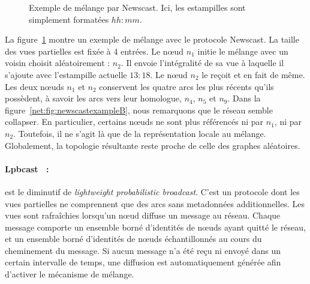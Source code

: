 \begin{figure}
  \centering
  \hspace{35pt}
  \caption[Exemple de mélange dans Newscast]
  {\label{net:fig:newscastexample} Exemple de mélange par Newscast. Ici, les
    estampilles sont simplement formatées $hh:mm$.}
\end{figure}

\noindent La figure~\ref{net:fig:newscastexample} montre un exemple de mélange
avec le protocole Newscast. La taille des vues partielles est fixée à 4
entrées. Le nœud $n_1$ initie le mélange avec un voisin choisit aléatoirement :
$n_2$. Il envoie l'intégralité de sa vue à laquelle il s'ajoute avec
l'estampille actuelle $13:18$. Le nœud $n_2$ le reçoit et en fait de même. Les
deux nœuds $n_1$ et $n_2$ conservent les quatre arcs les plus récents qu'ils
possèdent, à savoir les arcs vers leur homologue, $n_4$, $n_5$ et $n_9$. Dans la
figure~\ref{net:fig:newscastexampleB}, nous remarquons que le réseau semble
collapser. En particulier, certains nœuds ne sont plus référencés ni par $n_1$,
ni par $n_2$. Toutefois, il ne s'agit là que de la représentation locale au
mélange. Globalement, la topologie résultante reste proche de celle des graphes
aléatoires.

\paragraph{Lpbcast~\cite{eugster2003lightweight} :} est le diminutif de
\emph{lightweight probabilistic broadcast}. C'est un protocole dont les vues
partielles ne comprennent que des arcs sans metadonnées additionnelles.  Les
vues sont rafraîchies lorsqu'un nœud diffuse un message au réseau. Chaque
message comporte un ensemble borné d'identités de nœuds ayant quitté le réseau,
et un ensemble borné d'identités de nœuds échantillonnés au cours du cheminement
du message. Si aucun message n'a été reçu ni envoyé dans un certain intervalle
de temps, une diffusion est automatiquement générée afin d'activer le mécanisme
de mélange.

